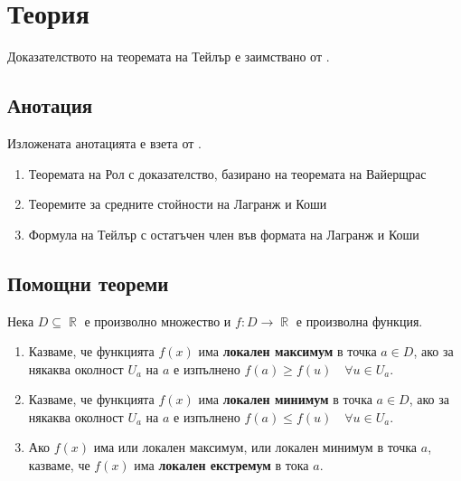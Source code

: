\documentclass{../../common/topic}
\begin{document}
\maketitle

\section{Теория}

Доказателството на теоремата на Тейлър е заимствано от \cite{Fichtenholz}.

\subsection{Анотация}

Изложената анотацията е взета от \cite{Syllabus}.

\begin{enumerate}
  \item Теоремата на Рол с доказателство, базирано на теоремата на Вайерщрас
  \item Теоремите за средните стойности на Лагранж и Коши
  \item Формула на Тейлър с остатъчен член във формата на Лагранж и Коши
\end{enumerate}

\subsection{Помощни теореми}

\begin{definition}
  Нека \( D \subseteq \BbbR \) е произволно множество и \( f: D \to \BbbR \) е произволна функция.

  \begin{enumerate}
    \item Казваме, че функцията \( f(x) \) има \textbf{локален максимум} в точка \( a \in D \), ако за някаква околност \( U_a \) на \( a \) е изпълнено \( f(a) \geq f(u)\quad\forall u \in U_a \).

    \item Казваме, че функцията \( f(x) \) има \textbf{локален минимум} в точка \( a \in D \), ако за някаква околност \( U_a \) на \( a \) е изпълнено \( f(a) \leq f(u)\quad\forall u \in U_a \).

    \item Ако \( f(x) \) има или локален максимум, или локален минимум в точка \( a \), казваме, че \( f(x) \) има \textbf{локален екстремум} в тока \( a \).
  \end{enumerate}
\end{definition}
\end{document}
